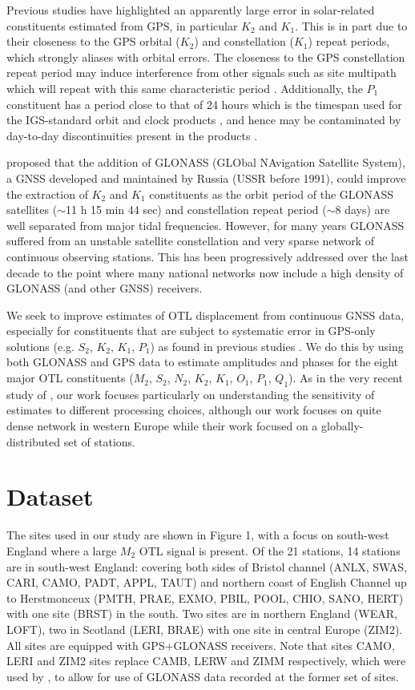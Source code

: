 \documentclass[se, manuscript]{copernicus}
\begin{document}
Previous studies have highlighted an apparently large error in solar-related constituents estimated from GPS, in particular $K_2$ and $K_1$. This is in part due to their closeness to the GPS orbital ($K_2$) and constellation ($K_1$) repeat periods, which strongly aliases with orbital errors. The closeness to the GPS constellation repeat period may induce interference from other signals such as site multipath which will repeat with this same characteristic period \citep{Schenewerk2001,Urschl2005,Thomas2006}. Additionally, the $P_1$ constituent has a period close to that of 24 hours which is the timespan used for the IGS-standard orbit and clock products \citep{Griffiths2009}, and hence may be contaminated by day-to-day discontinuities present in the products \citep{Ito2011}.

\cite{Urschl2005} proposed that the addition of GLONASS (GLObal NAvigation Satellite System), a GNSS developed and maintained by Russia (USSR before 1991), could improve the extraction of $K_2$ and $K_1$ constituents as the orbit period of the GLONASS satellites ($\sim$11 h 15 min 44 sec) and constellation repeat period ($\sim$8 days) are well separated from major tidal frequencies. However, for many years GLONASS suffered from an unstable satellite constellation and very sparse network of continuous observing stations. This has been progressively addressed over the last decade to the point where many national networks now include a high density of GLONASS (and other GNSS) receivers.

We seek to improve estimates of OTL displacement from continuous GNSS data, especially for constituents that are subject to systematic error in GPS-only solutions (e.g. $S_2$, $K_2$, $K_1$, $P_1$) as found in previous studies \citep{Allinson2004,King2006,Yuan2012}. We do this by using both GLONASS and GPS data to estimate amplitudes and phases for the eight major OTL constituents ($M_2$, $S_2$, $N_2$, $K_2$, $K_1$, $O_1$, $P_1$, $Q_1$). As in the very recent study of \cite{abbaszadeh_benefits_2020}, our work focuses particularly on understanding the sensitivity of estimates to different processing choices, although our work focuses on quite dense network in western Europe while their work focused on a globally-distributed set of stations.

\section{Dataset}
The sites used in our study are shown in Figure 1, with a focus on south-west England where a large $M_2$ OTL signal is present. Of the 21 stations, 14 stations are in south-west England: covering both sides of Bristol channel (ANLX, SWAS, CARI, CAMO, PADT, APPL, TAUT) and northern coast of English Channel up to Herstmonceux (PMTH, PRAE, EXMO, PBIL, POOL, CHIO, SANO, HERT) with one site (BRST) in the south. Two sites are in northern England (WEAR, LOFT), two in Scotland (LERI, BRAE) with one site in central Europe (ZIM2). All sites are equipped with GPS+GLONASS receivers. Note that sites CAMO, LERI and ZIM2 sites replace CAMB, LERW and ZIMM respectively, which were used by \cite{Penna2015}, to allow for use of GLONASS data recorded at the former set of sites.
\end{document}
